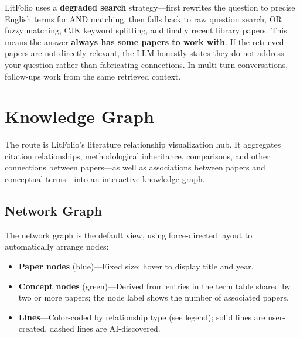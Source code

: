 \begin{tipbox}
LitFolio uses a \textbf{degraded search} strategy---first rewrites the question to precise English
terms for AND matching, then falls back to raw question search, OR fuzzy matching, CJK keyword
splitting, and finally recent library papers. This means the answer \textbf{always has some papers
to work with}. If the retrieved papers are not directly relevant, the LLM honestly states they
do not address your question rather than fabricating connections. In multi-turn conversations,
follow-ups work from the same retrieved context.
\end{tipbox}

\chapter{Knowledge Graph}
\label{ch:graph}

The  route is LitFolio's literature relationship visualization hub. It aggregates
citation relationships, methodological inheritance, comparisons, and other connections between
papers---as well as associations between papers and conceptual terms---into an interactive knowledge
graph.

\section{Network Graph}


The network graph is the default view, using force-directed layout to automatically arrange nodes:

\begin{itemize}
  \item \textbf{Paper nodes} (blue)---Fixed size; hover to display title and year.
  \item \textbf{Concept nodes} (green)---Derived from  entries in the term
    table shared by two or more papers; the node label shows the number of associated papers.
  \item \textbf{Lines}---Color-coded by relationship type (see legend); solid lines are
    user-created, dashed lines are AI-discovered.
\end{itemize}

